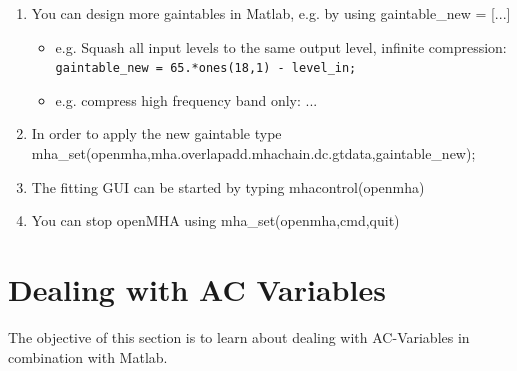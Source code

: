 \documentclass[11pt,a4paper,twoside]{article}
\newcommand{\+}{\discretionary{\mbox{\scriptsize$\hookleftarrow$}}{}{}}
\begin{document}
{{\begin{enumerate}
\item You can design more gaintables in Matlab, e.g. by using 
  {\ttfamily gaintable\_new = [...]}
  \begin{itemize}
  \item e.g. Squash all input levels to the same output level, infinite compression:
    \\ \texttt{gaintable\_new = 65.*ones(18,1) - level\_in;}
  \item e.g. compress high frequency band only: ...
  \end{itemize}
\item In order to apply the new gaintable type \\
{\ttfamily mha\_set(openmha,\textquotesingle{}mha.overlapadd.mhachain.dc.gtdata\textquotesingle{},gaintable\_new);}
\item The fitting GUI can be started by typing {\ttfamily mhacontrol(openmha)}
\item You can stop openMHA using {\ttfamily mha\_set(openmha,\textquotesingle{}cmd\textquotesingle{},\textquotesingle{}quit\textquotesingle{})}




\end{enumerate}
\newpage
\section{Dealing with AC Variables}
\label{sec:ac_variables}


The objective of this section is to learn about dealing with AC-Variables in combination with Matlab. \\ \\

}}
\end{document}

